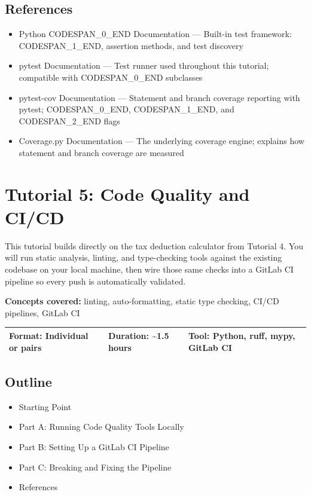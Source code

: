 \documentclass[11pt,a4paper]{book}
\begin{document}
\medskip

\section{References}

\begin{itemize}
  \item Python CODESPAN\_0\_END Documentation --- Built-in test framework: CODESPAN\_1\_END, assertion methods, and test discovery
  \item pytest Documentation --- Test runner used throughout this tutorial; compatible with CODESPAN\_0\_END subclasses
  \item pytest-cov Documentation --- Statement and branch coverage reporting with pytest; CODESPAN\_0\_END, CODESPAN\_1\_END, and CODESPAN\_2\_END flags
  \item Coverage.py Documentation --- The underlying coverage engine; explains how statement and branch coverage are measured
\end{itemize}


\chapter{Tutorial 5: Code Quality and CI/CD}

This tutorial builds directly on the tax deduction calculator from Tutorial 4. You will run static analysis, linting, and type-checking tools against the existing codebase on your local machine, then wire those same checks into a GitLab CI pipeline so every push is automatically validated.

\textbf{Concepts covered:} linting, auto-formatting, static type checking, CI/CD pipelines, GitLab CI

\begin{tabular}{lll}
\hline
\textbf{Format:} Individual or pairs & \textbf{Duration:} \textasciitilde{}1.5 hours & \textbf{Tool:} Python, ruff, mypy, GitLab CI \\
\hline
\end{tabular}

\medskip

\section{Outline}

\begin{itemize}
  \item Starting Point
  \item Part A: Running Code Quality Tools Locally
  \item Part B: Setting Up a GitLab CI Pipeline
  \item Part C: Breaking and Fixing the Pipeline
  \item References
\end{itemize}
\end{document}
